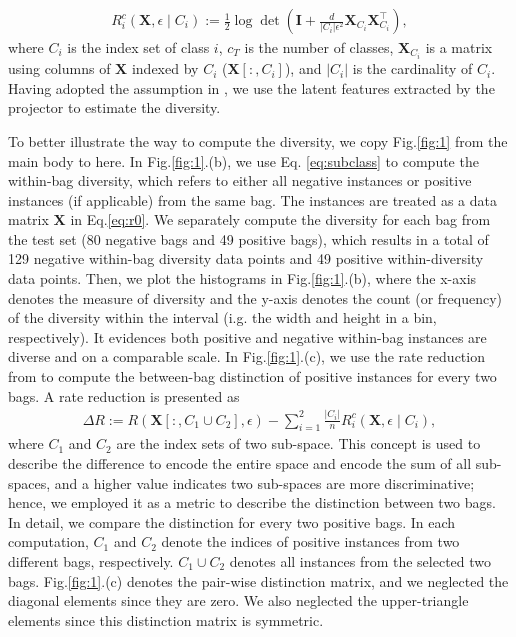\begin{align}\label{eq:subclass}
       R^c_i(\boldsymbol{X}, \epsilon \mid{C}_i) :=\frac{1}{2} \log \operatorname{det}\left(\boldsymbol{I}+\frac{d}{|C_i| \epsilon^2} \boldsymbol{X}_{C_i} \boldsymbol{X}^{\top}_{C_i}\right) ,
\end{align}
where $C_i$ is the index set of class $i$,
$c_T$ is the number of classes, $\boldsymbol{X}_{C_i}$ is a matrix using columns of $\boldsymbol{X}$ indexed by $C_i$ ($\boldsymbol{X}[:,C_i]$), and $|C_i|$ is the cardinality of $C_i$. 
Having adopted the assumption in \cite{yu2020learning}, we use the latent features extracted by the projector to estimate the diversity.

To better illustrate the way to compute the diversity, we copy Fig.\ref{fig:1} from the main body to here. In Fig.\ref{fig:1}.(b), we use Eq. \ref{eq:subclass} to compute the within-bag diversity, which refers to either all negative instances or positive instances (if applicable) from the same bag. The instances are treated as a data matrix $ \boldsymbol{X}$ in Eq.\ref{eq:r0}. We separately compute the diversity for each bag from the test set (80 negative bags and 49 positive bags), which results in a total of 129 negative within-bag diversity data points and 49 positive within-diversity data points. Then, we plot the histograms in Fig.\ref{fig:1}.(b), where the x-axis denotes the measure of diversity and the y-axis denotes the count (or frequency) of the diversity within the interval (i.g. the width and height in a bin, respectively).
It evidences both positive and negative within-bag instances are diverse and on a comparable scale. In Fig.\ref{fig:1}.(c), we use the rate reduction from \cite{yu2020learning} to compute the between-bag distinction of positive instances for every two bags. A rate reduction is presented as
\begin{align}
    \Delta R:=R(\boldsymbol{X}[:,C_1\cup C_2], \epsilon)- \sum_{i=1}^{2}\frac{|C_i|}{n} {R^c_i(\boldsymbol{X}, \epsilon \mid {C}_i)},
\end{align}
where $C_1$ and $ C_2$ are the index sets of two sub-space. This concept is used to describe the difference to encode the entire space and encode the sum of all sub-spaces, and a higher value indicates two sub-spaces are more discriminative; hence, we employed it as a metric to describe the distinction between two bags. In detail, we compare the distinction for every two positive bags. In each computation, 
$C_1$ and $ C_2$ denote the indices of positive instances from two different bags, respectively. $C_1\cup C_2$ denotes all instances from the selected two bags. Fig.\ref{fig:1}.(c) denotes the pair-wise distinction matrix, and we neglected the diagonal elements since they are zero. We also neglected the upper-triangle elements since this distinction matrix is symmetric.  


